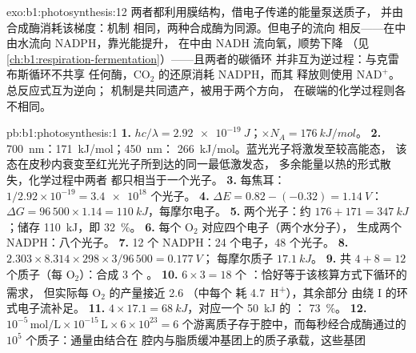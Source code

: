 \begin{solution}{exo:b1:photosynthesis:12}
两者都利用膜结构，借电子传递的能量泵送质子，
并由  合成酶消耗该梯度：机制
相同，两种合成酶为同源。但电子的流向
相反——在中由水流向 NADPH，靠光能提升，
在中由 NADH 流向氧，顺势下降
（见\cref{ch:b1:respiration-fermentation}）——且两者的碳循环
并非互为逆过程：与克雷布斯循环不共享
任何酶，$\mathrm{CO_2}$ 的还原消耗 NADPH，而其
释放则使用 $\mathrm{NAD^+}$。总反应式互为逆向；
机制是共同遗产，被用于两个方向，
在碳端的化学过程则各不相同。
\end{solution}

\begin{solution}{pb:b1:photosynthesis:1}
\textbf{1.} $hc/\lambda = \qty{2.92e-19}{J}$；$\times N_A = \qty{176}{kJ/mol}$。
\textbf{2.} \qty{700}{nm}：\qty{171}{kJ/mol}；\qty{450}{nm}：
\qty{266}{kJ/mol}。蓝光光子将激发至较高能态，
该态在皮秒内衰变至红光光子所到达的同一最低激发态，
多余能量以热的形式散失，化学过程中两者
都只相当于一个光子。
\textbf{3.} 每焦耳：$1/2.92\times 10^{-19} = \num{3.4e18}$ 个光子。
\textbf{4.} $\Delta E = 0.82 - (-0.32) = \qty{1.14}{V}$：$\Delta G =
96\,500\times 1.14 = \qty{110}{kJ}$，每摩尔电子。
\textbf{5.} 两个光子：约 $176 + 171 = \qty{347}{kJ}$；储存
\qty{110}{kJ}，即 \qty{32}{\%}。
\textbf{6.} 每个 $\mathrm{O_2}$ 对应四个电子（两个水分子），
生成两个 NADPH：八个光子。
\textbf{7.} 12 个 NADPH：24 个电子，48 个光子。
\textbf{8.} $2.303\times 8.314\times 298\times 3/96\,500 = \qty{0.177}{V}$；
每摩尔质子 $\qty{17.1}{kJ}$。
\textbf{9.} 共 $4 + 8 = 12$ 个质子（每 $\mathrm{O_2}$）：合成 3 个 。
\textbf{10.} $6\times 3 = 18$ 个 ：恰好等于该核算方式下循环的需求，
但实际每 $\mathrm{O_2}$ 的产量接近 2.6
（中每个  耗 \qty{4.7}{H^+}），其余部分
由绕 I 的环式电子流补足。
\textbf{11.} $4\times 17.1 = \qty{68}{kJ}$，对应一个 \qty{50}{kJ} 的 ：
\qty{73}{\%}。
\textbf{12.} $10^{-5}\,\mathrm{mol/L}\times 10^{-15}\,\mathrm{L}\times
6\times 10^{23} = 6$ 个游离质子存于腔中，而每秒经合成酶通过的 $10^5$
个质子：通量由结合在
腔内与脂质缓冲基团上的质子承载，这些基团

\end{solution}
